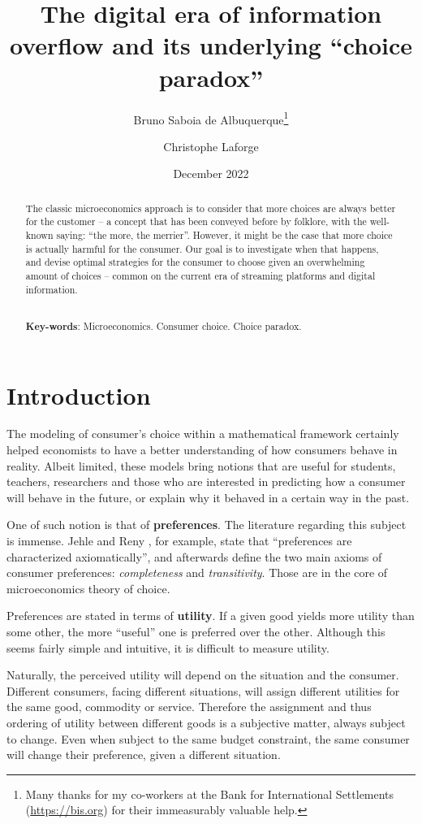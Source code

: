 \documentclass[12pt, letterpaper]{article}
\title{The digital era of information overflow and its underlying ``choice paradox''}
\author{Bruno Saboia de Albuquerque\thanks{Many thanks for my co-workers at the Bank for International Settlements (\url{https://bis.org}) for their immeasurably valuable help.}\and Christophe Laforge}
\date{December 2022}
\begin{document}
	\maketitle

	\begin{abstract}
		The classic microeconomics approach is to consider that more choices are always better for the customer -- a concept that has been conveyed before by folklore, with the well-known saying: ``the more, the merrier''. However, it might be the case that more choice is actually harmful for the consumer. Our goal is to investigate when that happens, and devise optimal strategies for the consumer to choose given an overwhelming amount of choices -- common on the current era of streaming platforms and digital information.

		\noindent
		\\\textbf{Key-words}: Microeconomics. Consumer choice. Choice paradox.

	\end{abstract}
	\clearpage

	\section{Introduction}
	The modeling of consumer's choice within a mathematical framework certainly helped economists to have a better understanding of how consumers behave in reality. Albeit limited, these models bring notions that are useful for students, teachers, researchers and those who are interested in predicting how a consumer will behave in the future, or explain why it behaved in a certain way in the past.

	One of such notion is that of \textbf{preferences}. The literature regarding this subject is immense. Jehle and Reny \cite{jehle2011advanced}, for example, state that ``preferences are characterized axiomatically'', and afterwards define the two main axioms of consumer preferences: \textit{completeness} and \textit{transitivity}. Those are in the core of microeconomics theory of choice.
	
	Preferences are stated in terms of \textbf{utility}. If a given good yields more utility than some other, the more ``useful'' one is preferred over the other. Although this seems fairly simple and intuitive, it is difficult to measure utility. 
	
	Naturally, the perceived utility will depend on the situation and the consumer. Different consumers, facing different situations, will assign different utilities for the same good, commodity or service. Therefore the assignment and thus ordering of utility between different goods is a subjective matter, always subject to change. Even when subject to the same budget constraint, the same consumer will change their preference, given a different situation.
	
\end{document}
